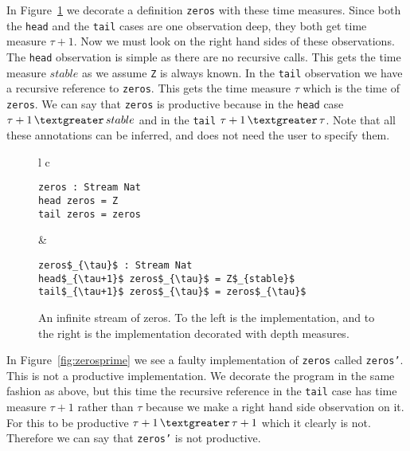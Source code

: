 In Figure~\ref{fig:zeros} we decorate a definition \texttt{zeros} with these time measures. Since both the \texttt{head} and the \texttt{tail} cases are one observation deep, they both get time measure $\tau+1$. Now we must look on the right hand sides of these observations. The \texttt{head} observation is simple as there are no recursive calls. This gets the time measure $stable$  as we assume \texttt{Z} is always known. In the \texttt{tail} observation we have a recursive reference to \texttt{zeros}. This gets the time measure $\tau$ which is the time of \texttt{zeros}. We can say that \texttt{zeros} is productive because in the \texttt{head} case $\tau+1\,\textgreater\,stable$ and in the \texttt{tail} $\tau+1\,\textgreater\,\tau$. Note that all these annotations can be inferred, and does not need the user to specify them.

\begin{figure}
\begin{tabular}{l c}
\begin{minipage}{3in}
\begin{Verbatim}[commandchars=\\\{\},codes={\catcode`$=3\catcode`_=8}]
zeros : Stream Nat
head zeros = Z
tail zeros = zeros
\end{Verbatim}
\end{minipage} &
\begin{minipage}{3in}
\begin{Verbatim}[commandchars=\\\{\},codes={\catcode`$=3\catcode`_=8}]
zeros$_{\tau}$ : Stream Nat
head$_{\tau+1}$ zeros$_{\tau}$ = Z$_{stable}$
tail$_{\tau+1}$ zeros$_{\tau}$ = zeros$_{\tau}$
\end{Verbatim}
\end{minipage}
\end{tabular}
\caption{An infinite stream of zeros. To the left is the implementation, and to the right is the implementation decorated with depth measures.}
\label{fig:zeros}
\end{figure}

In Figure~\ref{fig:zerosprime} we see a faulty implementation of \texttt{zeros} called \texttt{zeros'}. This is not a productive implementation. We decorate the program in the same fashion as above, but this time the recursive reference in the \texttt{tail} case has time measure $\tau+1$ rather than $\tau$ because we make a right hand side observation on it. For this to be productive $\tau+1\,\textgreater\,\tau+1$ which it clearly is not. Therefore we can say that \texttt{zeros'} is not productive.

